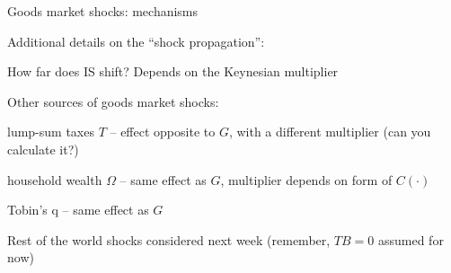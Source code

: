 \documentclass{beamer}
\newenvironment{mytemize}
{\vfill\itemize[nolistsep,itemsep=\fill,label=\color{blue}{$\triangleright$}]}
  {\enditemize}
\begin{document}
\begin{frame}{Goods market shocks: mechanisms}

  Additional details on the ``shock propagation'':
\begin{mytemize}
\item How far does IS shift? Depends on the Keynesian multiplier
\item Other sources of goods market shocks:
\begin{mytemize}
\small
\item lump-sum taxes $T$ -- effect opposite to $G$, with a different multiplier \textcolor{mint}{(can you calculate it?)}
\item household wealth $\Omega$ -- same effect as $G$, multiplier depends on form of $C(\cdot)$
\item Tobin's q -- same effect as $G$
\end{mytemize}
\item Rest of the world shocks considered next week (remember, $TB=0$ assumed for now)
\end{mytemize}

\end{frame}
\end{document}
